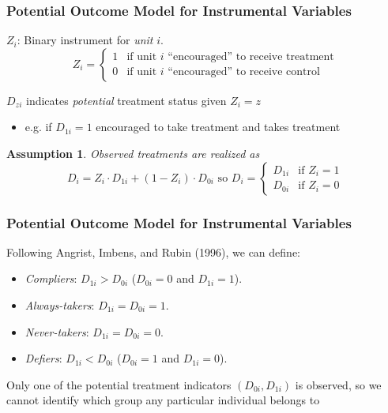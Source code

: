 \documentclass[xcolor=dvipsnames]{beamer}
\newtheorem{assumption}{Assumption}
\begin{document}
\begin{frame}
  \frametitle{Potential Outcome Model for Instrumental Variables}
 \begin{definition}[Instrument]
$Z_i$: Binary instrument for {\em unit} $i$.
 \[
 Z_i = \left\{
 \begin{array}{ll}
  1 & \mbox{if unit $i$ ``encouraged'' to receive treatment}\\
  0 & \mbox{if unit $i$ ``encouraged'' to receive control}
 \end{array}
 \right.
 \]
\end{definition}

 \begin{definition}
 $D_{zi}$ indicates \emph{potential} treatment status given $Z_i=z$
\begin{itemize}
\item e.g. if $D_{1i}=1$ encouraged to take treatment and takes treatment
\end{itemize}
\end{definition}

 \begin{assumption}
Observed treatments are realized as
\[
D_i = Z_i \cdot D_{1i}+(1-Z_i)\cdot D_{0i} \,\, \mbox{so}\,\,
D_i = \left\{
 \begin{array}{ll}
  D_{1i} & \mbox{if $Z_i=1$}\\
  D_{0i} & \mbox{if $Z_i=0$}
 \end{array}
 \right.
\]
\end{assumption}
\end{frame}


\begin{frame}
\frametitle{Potential Outcome Model for Instrumental Variables}
Following Angrist, Imbens, and Rubin (1996), we can define:\bigskip
\begin{Definition}
\begin{itemize}
 \item {\em Compliers}: $D_{1i}>D_{0i}$ ($D_{0i}=0$ and $D_{1i}=1$).
 \item {\em Always-takers}: $D_{1i}=D_{0i}=1$.
 \item {\em Never-takers}: $D_{1i}=D_{0i}=0$.
 \item {\em Defiers}: $D_{1i}<D_{0i}$ ($D_{0i}=1$ and $D_{1i}=0$).
\end{itemize}
\end{Definition}
\begin{Problem}
Only one of the potential treatment indicators
$(D_{0i},D_{1i})$ is observed, so we cannot identify which group any particular individual belongs to
\end{Problem}
\end{frame}
\end{document}
